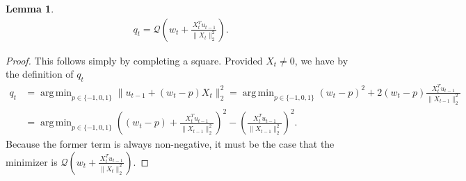\documentclass[journal,onecolumn,11pt,final]{IEEEtran}
\newcommand{\1}{\mathbb{1}}
\DeclareMathOperator*{\argmin}{arg\,min}    %
\theoremstyle{plain}
\theoremstyle{definition}
\theoremstyle{plain}
\theoremstyle{plain}
\newtheorem{lemma}[theorem]{Lemma}
\theoremstyle{definition}
\newcommand{\Qc}{\mathcal{Q}}
\begin{document}
\begin{lemma}\label{lem: q rounds w with dither}	
	\begin{align*}
		q_t = \Qc\left( w_t + \frac{X_t^T u_{t-1}}{\|X_t\|_2^2}\right).
	\end{align*}
\end{lemma}
\begin{proof}
	This follows simply by completing a square. Provided \(X_t \neq 0\), we have by the definition of \(q_t\)
	\begin{align*}
		q_t &= \argmin_{p \in \{-1, 0, 1\}} \| u_{t-1} + (w_t - p) X_t\|_2^2 = \argmin_{p \in \{-1, 0, 1\}} (w_t - p)^2 + 2(w_t-p) \frac{X_t^T u_{t-1}}{\|X_{t-1}\|_2^2}\\
		&=  \argmin_{p \in \{-1, 0, 1\}} \left((w_t - p) +  \frac{X_t^T u_{t-1}}{\|X_{t-1}\|_2^2}\right)^2 -  \left(\frac{X_t^T u_{t-1}}{\|X_{t-1}\|_2^2}\right)^2.
	\end{align*}
	Because the former term is always non-negative, it must be the case that the minimizer is \( \Qc\left( w_t + \frac{X_t^T u_{t-1}}{\|X_t\|_2^2}\right)\).
\end{proof}
\end{document}
